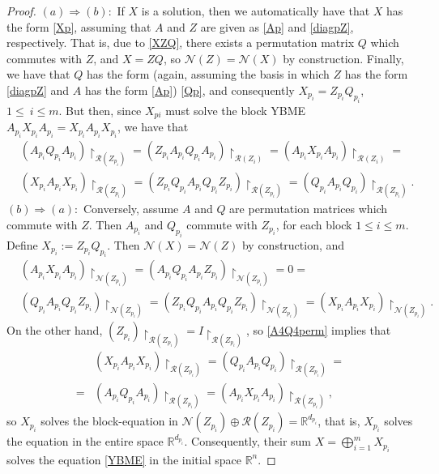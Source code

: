 \documentclass{article}
\theoremstyle{definition}\newtheorem{example}{Example}[section]
\def\N{{\mathcal{N}}}
\def\R{{\mathcal{R}}}
\def\RR{\mathbb{R}}
\begin{document}
\begin{proof} $(a)\Rightarrow(b):$
If $X$ is a solution, then we automatically have that $X$ has the form \eqref{Xp}, assuming that $A$ and $Z$ are given as \eqref{Ap} and \eqref{diagpZ}, respectively. That is, due to \eqref{XZQ}, there exists a permutation matrix $Q$ which commutes with $Z$, and $X=ZQ$, so $\N(Z)=\N(X)$ by construction. Finally, we have that $Q$ has the form (again, assuming the basis in which $Z$ has the form \eqref{diagpZ} and $A$ has the form \eqref{Ap}) \eqref{Qp}, and consequently $X_{p_i}=Z_{p_i}Q_{p_i}$, $1\leq\ i\leq m$. But then, since $X_{pi}$ must solve the block YBME $A_{p_i}X_{p_i}A_{p_i}=X_{p_i}A_{p_i}X_{p_i}$, we have that
$$\begin{aligned}
&(A_{p_i}Q_{p_i}A_{p_i})\upharpoonright_{\R(Z_{p_i})}=(Z_{p_i}A_{p_i}Q_{p_i}A_{p_i})\upharpoonright_{\R(Z_i)}=(A_{p_i}X_{p_i}A_{p_i})\upharpoonright_{\R(Z_i)}=\\
&(X_{p_i}A_{p_i}X_{p_i})\upharpoonright_{\R(Z_{p_i})}=(Z_{p_i}Q_{p_i}A_{p_i}Q_{p_i}Z_{p_i})\upharpoonright_{\R(Z_{p_i})}=(Q_{p_i}A_{p_i}Q_{p_i})\upharpoonright_{\R(Z_{p_i})}.
\end{aligned}$$
$(b)\Rightarrow(a):$ Conversely, assume $A$ and $Q$ are permutation matrices which commute with $Z$. Then $A_{p_i}$ and $Q_{p_i}$ commute with $Z_{p_i}$, for each block $1\leq i\leq m$. Define $X_{p_i}:=Z_{p_i}Q_{p_i}$. Then $\N(X)=\N(Z)$ by construction, and 
$$\begin{aligned}
&(A_{p_i}X_{p_i}A_{p_i})\upharpoonright_{\N(Z_{p_i})}=(A_{p_i}Q_{p_i}A_{p_i}Z_{p_i})\upharpoonright_{\N(Z_{p_i})}=0=\\
&(Q_{p_i}A_{p_i}Q_{p_i}Z_{p_i})\upharpoonright_{\N(Z_{p_i})}=(Z_{p_i}Q_{p_i}A_{p_i}Q_{p_i}Z_{p_i})\upharpoonright_{\N(Z_{p_i})}=(X_{p_i}A_{p_i}X_{p_i})\upharpoonright_{\N(Z_{p_i})}.
\end{aligned}$$
On the other hand, $(Z_{p_i})\upharpoonright_{\R(Z_{p_i})}=I\upharpoonright_{\R(Z_{p_i})}$, so \eqref{A4Q4perm} implies that
$$\begin{aligned}
	&(X_{p_i}A_{p_i}X_{p_i})\upharpoonright_{\R(Z_{p_i})}=(Q_{p_i}A_{p_i}Q_{p_i})\upharpoonright_{\R(Z_{p_i})}=\\
	=&(A_{p_i}Q_{p_i}A_{p_i})\upharpoonright_{\R(Z_{p_i})}=(A_{p_i}X_{p_i}A_{p_i})\upharpoonright_{\R(Z_{p_i})},
\end{aligned}$$
so $X_{p_i}$ solves the block-equation in $\N(Z_{p_i})\oplus\R(Z_{p_i})=\RR^{d_{p_i}}$, that is, $X_{p_i}$ solves the equation in the entire space $\RR^{d_{p_i}}$. Consequently, their sum $X=\bigoplus\limits_{i=1}^mX_{p_i}$ solves the equation \eqref{YBME} in the initial space $\RR^n$. 
\end{proof}
\end{document}
